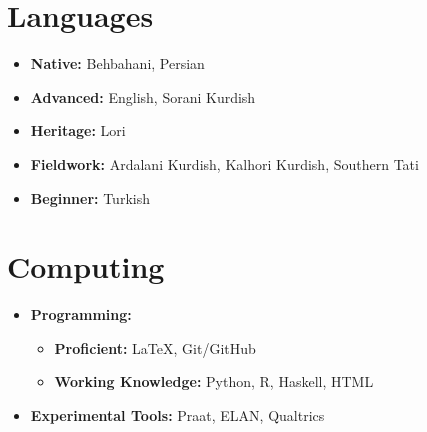 \documentclass[a4paper,10pt]{article}
\begin{document}
\section*{Languages}
\begin{itemize}[leftmargin=0.5cm]
    \item \textbf{Native:} Behbahani, Persian
    \item \textbf{Advanced:} English, Sorani Kurdish
    \item \textbf{Heritage:} Lori
    \item \textbf{Fieldwork:} Ardalani Kurdish, Kalhori Kurdish, Southern Tati
    \item \textbf{Beginner:} Turkish
\end{itemize}

\section*{Computing}
\begin{itemize}[itemsep=0.3em]
    \item \textbf{Programming:} 
      \begin{itemize}[label={--}, leftmargin=0.4cm]
            \item \textbf{Proficient:} \LaTeX, Git/GitHub
            \item \textbf{Working Knowledge:} Python, R, Haskell, HTML
        \end{itemize}
    \item \textbf{Experimental Tools:} Praat, ELAN, Qualtrics
\end{itemize}

\vspace{8pt}
\end{document}
